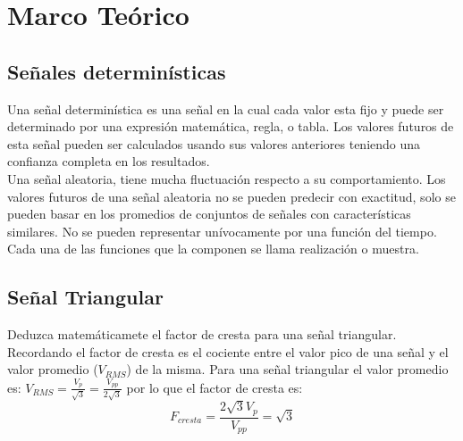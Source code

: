 \documentclass{article}
\author{Pablo Vivar Colina}
\begin{document}


\tableofcontents  %

\listoffigures  %


\section{Marco Teórico}

\subsection{Señales determinísticas}

Una señal determinística es una señal en la cual cada valor esta fijo y puede ser determinado por una expresión matemática, regla, o tabla. Los valores futuros de esta señal pueden ser calculados usando sus valores anteriores teniendo una confianza completa en los resultados.\citep{SenialesDeterministicas}\\

Una señal aleatoria, tiene mucha fluctuación respecto a su comportamiento. Los valores futuros de una señal aleatoria no se pueden predecir con exactitud, solo se pueden basar en los promedios de conjuntos de señales con características similares. No se pueden representar unívocamente por una función del tiempo. Cada una de las funciones que la componen se llama realización o muestra.\citep{SenialesDeterministicas}\\

\subsection{Señal Triangular}

Deduzca matemáticamete el factor de cresta para una señal triangular.\\

Recordando el factor de cresta es el cociente entre el valor pico de una señal y el valor promedio ($V_{RMS}$) de la misma. Para una señal triangular el valor promedio es: $V_{RMS}=\frac{V_p}{\sqrt{3}}=\frac{V_{pp}}{2\sqrt{3}}$ por lo que el factor de cresta es:\\

\begin{equation}
    F_{cresta}=\frac{2\sqrt{3}V_p}{V_{pp}}=\sqrt{3}
\end{equation}
\end{document}

